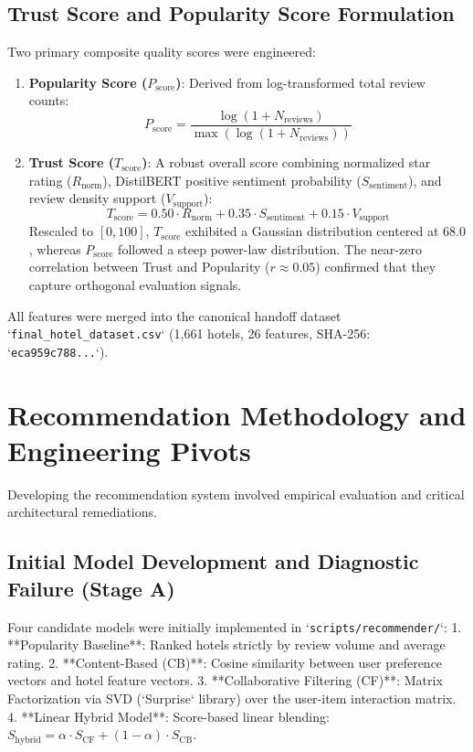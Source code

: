 \subsection{Trust Score and Popularity Score Formulation}
Two primary composite quality scores were engineered:
\begin{enumerate}
    \item \textbf{Popularity Score ($P_{\text{score}}$)}: Derived from log-transformed total review counts:
    \begin{equation}
    P_{\text{score}} = \frac{\log(1 + N_{\text{reviews}})}{\max(\log(1 + N_{\text{reviews}}))}
    \end{equation}
    \item \textbf{Trust Score ($T_{\text{score}}$)}: A robust overall score combining normalized star rating ($R_{\text{norm}}$), DistilBERT positive sentiment probability ($S_{\text{sentiment}}$), and review density support ($V_{\text{support}}$):
    \begin{equation}
    T_{\text{score}} = 0.50 \cdot R_{\text{norm}} + 0.35 \cdot S_{\text{sentiment}} + 0.15 \cdot V_{\text{support}}
    \end{equation}
    Rescaled to $[0, 100]$, $T_{\text{score}}$ exhibited a Gaussian distribution centered at $68.0$, whereas $P_{\text{score}}$ followed a steep power-law distribution. The near-zero correlation between Trust and Popularity ($r \approx 0.05$) confirmed that they capture orthogonal evaluation signals.
\end{enumerate}

All features were merged into the canonical handoff dataset `\texttt{final\_hotel\_dataset.csv}` (1,661 hotels, 26 features, SHA-256: `\texttt{eca959c788...}`).

\section{Recommendation Methodology and Engineering Pivots}
Developing the recommendation system involved empirical evaluation and critical architectural remediations.

\subsection{Initial Model Development and Diagnostic Failure (Stage A)}
Four candidate models were initially implemented in `\texttt{scripts/recommender/}`:
1. **Popularity Baseline**: Ranked hotels strictly by review volume and average rating.
2. **Content-Based (CB)**: Cosine similarity between user preference vectors and hotel feature vectors.
3. **Collaborative Filtering (CF)**: Matrix Factorization via SVD (`Surprise` library) over the user-item interaction matrix.
4. **Linear Hybrid Model**: Score-based linear blending: $S_{\text{hybrid}} = \alpha \cdot S_{\text{CF}} + (1-\alpha) \cdot S_{\text{CB}}$.

